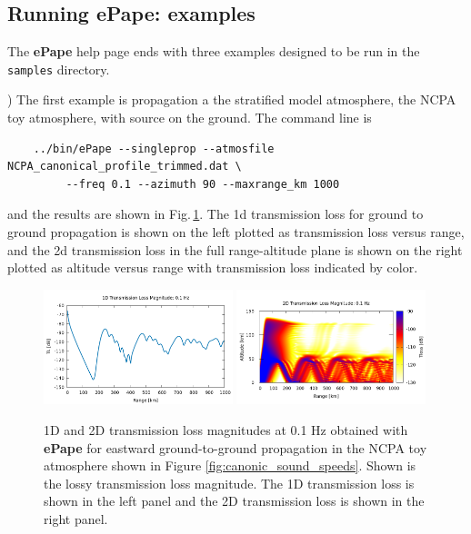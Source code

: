 \subsection{Running ePape: examples}
\label{sec: pade examples}

The {\bf ePape} help page ends with three examples designed to be run in the \verb+samples+ directory. 

) The first example is propagation a the stratified model atmosphere, the NCPA toy atmosphere, with source on the ground. The command line is 
\begin{verbatim}
    ../bin/ePape --singleprop --atmosfile NCPA_canonical_profile_trimmed.dat \
         --freq 0.1 --azimuth 90 --maxrange_km 1000
\end{verbatim}
and the results are shown in Fig.\,\ref{fig: ePape ex1}. The 1d transmission loss for ground to ground propagation is shown on the left plotted as transmission loss versus range, and the 2d transmission loss in the full range-altitude plane is shown on the right plotted as altitude versus range with transmission loss indicated by color. 

\begin{figure}[h]
\begin{center}
\includegraphics[width=0.49\textwidth]{figs/ePape_ex1_1d}
\includegraphics[width=0.49\textwidth]{figs/ePape_ex1_2d}
\end{center}
\caption{1D and 2D transmission loss magnitudes at 0.1 Hz obtained with {\bf ePape} for eastward ground-to-ground propagation in the NCPA toy atmosphere shown in Figure \ref{fig:canonic_sound_speeds}. Shown is the lossy transmission loss magnitude. The 1D transmission loss is shown in the left panel and the 2D transmission loss is shown in the right panel.}
\label{fig: ePape ex1}
\end{figure}

